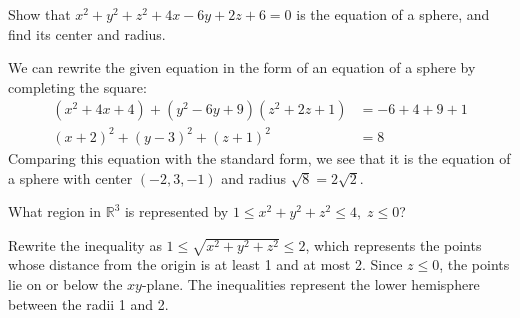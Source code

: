   \begin{example}
    Show that $x^2 + y^2 + z^2 + 4x - 6y + 2z + 6 = 0$ is the equation of a sphere, and find its center and radius.
  \end{example}
  \begin{solution}
    We can rewrite the given equation in the form of an equation of a sphere by completing the square:
    \begin{align*}
      (x^2 + 4x + 4) + (y^2 - 6y + 9) (z^2 + 2z + 1) &= -6 + 4 + 9 + 1 \\
      (x+2)^2 + (y-3)^2 + (z+1)^2 &= 8
    \end{align*}
    Comparing this equation with the standard form, we see that it is the equation of a sphere with center $(-2,3,-1)$ and radius $\sqrt{8} = 2\sqrt{2}$.
  \end{solution}
  \begin{example}
    What region in $\mathbb{R}^3$ is represented by $ 1 \leq x^2 + y^2 + z^2 \leq 4,\; z \leq 0$?
  \end{example}
  \begin{solution}
    Rewrite the inequality as $1 \leq \sqrt{x^2 + y^2 + z^2} \leq 2$, which represents the points whose distance from the origin  is at least 1 and at most 2. Since $z \leq 0$, the points lie on or below the $xy$-plane. The inequalities represent the lower hemisphere between the radii 1 and 2.
  \end{solution}
